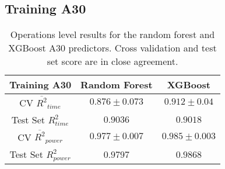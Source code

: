 \subsection{Training A30}



\begin{table}[h!]
\centering
\begin{tabular}{|c|c|c|}
\hline
 \textbf{Training A30}& \textbf{Random Forest} & \textbf{XGBoost} \\
\hline
CV $\overline{R^2}_{time}$ & $0.876 \pm 0.073$ &  $0.912 \pm 0.04$ \\
\hline
Test Set $R^2_{time}$ & $0.9036$ & $0.9018$ \\
\hline
CV $\overline{R^2}_{power}$ & $0.977 \pm 0.007$  &  $0.985 \pm 0.003$\\
\hline
Test Set $R^2_{power}$ & $0.9797$ & $0.9868$ \\
\hline
\end{tabular}
\caption{Operations level results for the random forest and XGBoost A30 predictors. Cross validation and test set score are in close agreement.}
\label{tab:pred_res}
\end{table}



